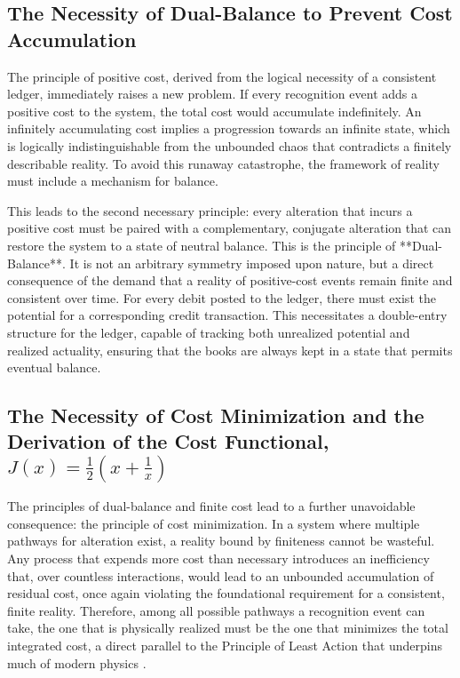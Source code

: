 \subsection{The Necessity of Dual-Balance to Prevent Cost Accumulation}
The principle of positive cost, derived from the logical necessity of a consistent ledger, immediately raises a new problem. If every recognition event adds a positive cost to the system, the total cost would accumulate indefinitely. An infinitely accumulating cost implies a progression towards an infinite state, which is logically indistinguishable from the unbounded chaos that contradicts a finitely describable reality. To avoid this runaway catastrophe, the framework of reality must include a mechanism for balance.

This leads to the second necessary principle: every alteration that incurs a positive cost must be paired with a complementary, conjugate alteration that can restore the system to a state of neutral balance. This is the principle of **Dual-Balance**. It is not an arbitrary symmetry imposed upon nature, but a direct consequence of the demand that a reality of positive-cost events remain finite and consistent over time. For every debit posted to the ledger, there must exist the potential for a corresponding credit transaction. This necessitates a double-entry structure for the ledger, capable of tracking both unrealized potential and realized actuality, ensuring that the books are always kept in a state that permits eventual balance.

\subsection{The Necessity of Cost Minimization and the Derivation of the Cost Functional, \texorpdfstring{$J(x) = \frac{1}{2}(x + \frac{1}{x})$}{J(x) = 1/2(x + 1/x)}}

The principles of dual-balance and finite cost lead to a further unavoidable consequence: the principle of cost minimization. In a system where multiple pathways for alteration exist, a reality bound by finiteness cannot be wasteful. Any process that expends more cost than necessary introduces an inefficiency that, over countless interactions, would lead to an unbounded accumulation of residual cost, once again violating the foundational requirement for a consistent, finite reality. Therefore, among all possible pathways a recognition event can take, the one that is physically realized must be the one that minimizes the total integrated cost, a direct parallel to the Principle of Least Action that underpins much of modern physics \parencite{Landau1976}.

